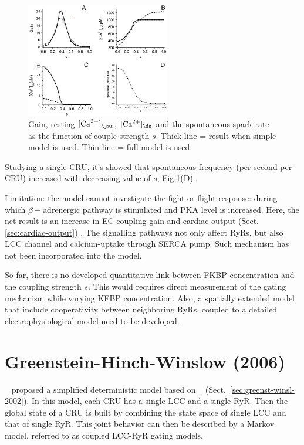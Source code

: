 \begin{figure}[hbt]
  \centerline{\includegraphics[height=5cm]{./images/Wang2005_couplestrength.eps}}
  \caption{Gain, resting $[\Ca]_\jsr$, $[\Ca]_\ds$ and the spontaneous spark
  rate as the function of couple strength $s$. Thick line = result when simple
  model is used. Thin line = full model is used}
\label{fig:Wang2005_couplestrength}
\end{figure}


Studying a single CRU, it's showed that spontaneous frequency (per second per
CRU) increased with decreasing value of $s$,
Fig.\ref{fig:Wang2005_couplestrength}(D).

Limitation: the model cannot investigate the fight-or-flight response: during
which $\beta-$adrenergic pathway is stimulated and PKA level is increased.
Here, the net result is an increase in EC-coupling gain and cardiac output
(Sect.\ref{sec:cardiac-output}) \citep{wehrens2003af}. The signalling pathways
not only affect RyRs, but also LCC channel and calcium-uptake through SERCA
pump. Such mechanism has not been incorporated into the model.

So far, there is no developed quantitative link between FKBP concentration and
the coupling strength $s$. This would requires direct measurement of the
gating mechanism while varying KFBP concentration. Also, a spatially extended
model that include cooperativity between neighboring RyRs, coupled to a detailed
electrophysiological model need to be developed. 


\section{Greenstein-Hinch-Winslow (2006)}
\label{sec:greenst-hinch-winsl}

~\citep{greenstein2006} proposed a simplified deterministic model
based on ~\citep{greenstein2002} (Sect.~\ref{sec:greenst-winsl-2002}).
In this model, each CRU has a single LCC and a single RyR. Then the global state
of a CRU is built by combining the state space of single LCC and that of single
RyR. This joint behavior can then be described by a Markov model, referred to as
coupled LCC-RyR gating models. 

